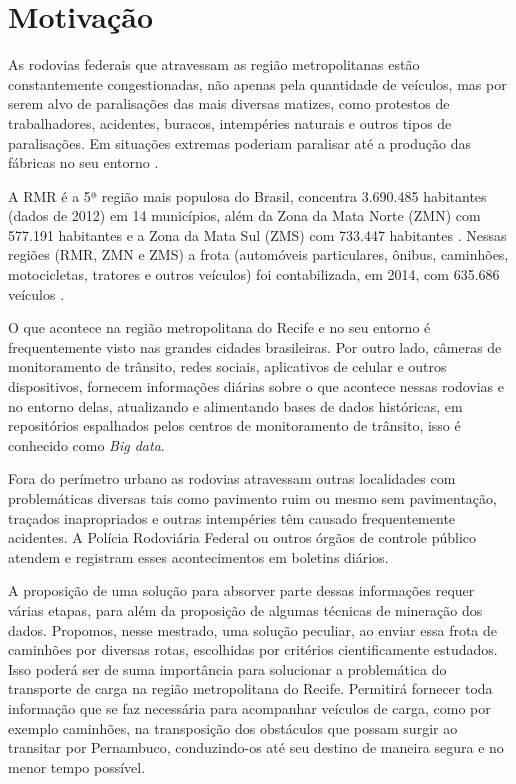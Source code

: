 
\section{ Motivação}\label{intro:motivacao}

As rodovias federais que atravessam as região metropolitanas estão constantemente congestionadas, não apenas pela 
quantidade de veículos, mas por serem alvo de paralisações das mais diversas matizes, como protestos de trabalhadores, acidentes, buracos, intempéries naturais e outros tipos de paralisações. 
Em situações extremas poderiam paralisar até a produção das fábricas no seu entorno \cite{BNDES2013}. 

A RMR é a 5ª região mais populosa do Brasil, concentra 3.690.485 habitantes (dados de 2012) em 14 municípios, além da 
Zona da Mata Norte (ZMN) com 577.191 habitantes e a Zona da Mata Sul (ZMS) com 733.447 habitantes \cite{Bitoun2012}. 
Nessas regiões (RMR, ZMN e ZMS) a frota (automóveis particulares, ônibus, caminhões, motocicletas, tratores e outros veículos) 
foi contabilizada, em 2014, com 635.686 veículos \cite{FrotaVeiculosIBGE}.

O que acontece na região metropolitana do Recife e no seu entorno é frequentemente visto nas grandes cidades brasileiras.
Por outro lado, câmeras de monitoramento de trânsito, redes sociais, aplicativos de celular e outros dispositivos, fornecem informações diárias sobre o que acontece nessas 
rodovias e no entorno delas, atualizando e alimentando bases de dados históricas, em repositórios espalhados pelos centros de 
monitoramento de trânsito, isso é conhecido como \textit{Big data}.

Fora do perímetro urbano as rodovias atravessam outras localidades com problemáticas diversas tais como pavimento ruim ou mesmo sem pavimentação, 
traçados inapropriados e outras intempéries têm causado frequentemente acidentes.
A Polícia Rodoviária Federal ou outros órgãos de controle público atendem e registram esses acontecimentos em boletins diários.

A proposição de uma solução para absorver parte dessas informações requer várias etapas, para além da proposição de algumas técnicas de mineração dos dados.
Propomos, nesse mestrado, uma solução peculiar, ao enviar essa frota de caminhões por diversas rotas, escolhidas por critérios cientificamente estudados.
Isso poderá ser de suma importância para solucionar a problemática do transporte de carga na região metropolitana 
do Recife. Permitirá fornecer toda informação que se faz necessária para acompanhar veículos de carga, como por exemplo caminhões, 
na transposição dos obstáculos que possam surgir ao transitar por Pernambuco, conduzindo-os até seu destino de maneira segura e no menor tempo possível.

